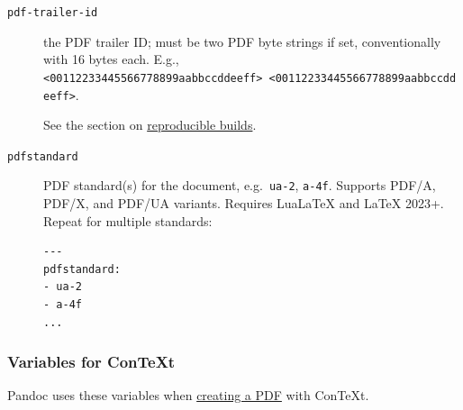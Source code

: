 \documentclass[
]{article}
\begin{document}
\begin{description}
\item[\texttt{pdf-trailer-id}]
the PDF trailer ID; must be two PDF byte strings if set, conventionally
with 16 bytes each. E.g.,
\texttt{\textless{}00112233445566778899aabbccddeeff\textgreater{}\ \textless{}00112233445566778899aabbccddeeff\textgreater{}}.

See the section on \protect\hyperlink{reproducible-builds}{reproducible
builds}.
\item[\texttt{pdfstandard}]
PDF standard(s) for the document, e.g.~\texttt{ua-2}, \texttt{a-4f}.
Supports PDF/A, PDF/X, and PDF/UA variants. Requires LuaLaTeX and LaTeX
2023+. Repeat for multiple standards:

\begin{verbatim}
---
pdfstandard:
- ua-2
- a-4f
...
\end{verbatim}
\end{description}

\hypertarget{variables-for-context}{%
\subsubsection{Variables for ConTeXt}\label{variables-for-context}}

Pandoc uses these variables when
\protect\hyperlink{creating-a-pdf}{creating a PDF} with ConTeXt.
\end{document}

